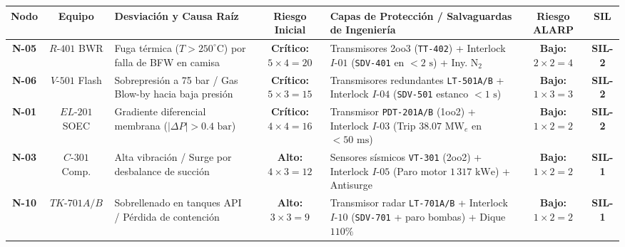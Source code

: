 \documentclass[10pt,landscape]{article}
\newcommand{\badgegreen}[1]{\colorbox{badgegreen}{\textbf{\color{emeraldgreen}\fontsize{6.8pt}{8pt}\selectfont #1}}}
\newcommand{\badgeamber}[1]{\colorbox{badgeamber}{\textbf{\color{amber!90!black}\fontsize{6.8pt}{8pt}\selectfont #1}}}
\newcommand{\badgered}[1]{\colorbox{badgered}{\textbf{\color{darkred}\fontsize{6.8pt}{8pt}\selectfont #1}}}
\begin{document}
\begin{center}
  \begin{tcolorbox}[colback=white,colframe=navyblue!70,arc=1.5mm,boxrule=0.7pt,top=2.0pt,bottom=2.0pt,left=3pt,right=3pt,width=\textwidth]
    \fontsize{4.8pt}{5.8pt}\selectfont
    \renewcommand{\arraystretch}{1.08}
    \begin{tabularx}{\textwidth}{c c p{3.2cm} c X c c}
      \toprule
      \rowcolor{tableheader}
      \textbf{\color{white}Nodo} & 
      \textbf{\color{white}Equipo} & 
      \textbf{\color{white}Desviación y Causa Raíz} & 
      \textbf{\color{white}Riesgo Inicial} & 
      \textbf{\color{white}Capas de Protección / Salvaguardas de Ingeniería} & 
      \textbf{\color{white}Riesgo ALARP} & 
      \textbf{\color{white}SIL} \\
      \midrule
      \rowcolor{roweven}
      \textbf{N-05} & $R\text{-}401$ BWR & Fuga térmica ($T > 250^\circ\text{C}$) por falla de BFW en camisa & \badgered{Crítico: $5 \times 4 = 20$} & Transmisores 2oo3 (\texttt{TT-402}) + Interlock $I\text{-}01$ (\texttt{SDV-401} en $<2\text{ s}$) + Iny. $\text{N}_2$ & \badgegreen{Bajo: $2 \times 2 = 4$} & \badgered{SIL-2} \\
      \rowcolor{rowodd}
      \textbf{N-06} & $V\text{-}501$ Flash & Sobrepresión a 75 bar / Gas Blow-by hacia baja presión & \badgered{Crítico: $5 \times 3 = 15$} & Transmisores redundantes \texttt{LT-501A/B} + Interlock $I\text{-}04$ (\texttt{SDV-501} estanco $<1\text{ s}$) & \badgegreen{Bajo: $1 \times 3 = 3$} & \badgered{SIL-2} \\
      \rowcolor{roweven}
      \textbf{N-01} & $EL\text{-}201$ SOEC & Gradiente diferencial membrana ($|\Delta P| > 0.4\text{ bar}$) & \badgered{Crítico: $4 \times 4 = 16$} & Transmisor \texttt{PDT-201A/B} (1oo2) + Interlock $I\text{-}03$ (Trip $38.07\text{ MW}_e$ en $<50\text{ ms}$) & \badgegreen{Bajo: $1 \times 2 = 2$} & \badgered{SIL-2} \\
      \rowcolor{rowodd}
      \textbf{N-03} & $C\text{-}301$ Comp. & Alta vibración / Surge por desbalance de succión & \badgeamber{Alto: $4 \times 3 = 12$} & Sensores sísmicos \texttt{VT-301} (2oo2) + Interlock $I\text{-}05$ (Paro motor $1\,317\text{ kWe}$) + Antisurge & \badgegreen{Bajo: $1 \times 2 = 2$} & \badgeamber{SIL-1} \\
      \rowcolor{roweven}
      \textbf{N-10} & $TK\text{-}701A/B$ & Sobrellenado en tanques API / Pérdida de contención & \badgeamber{Alto: $3 \times 3 = 9$} & Transmisor radar \texttt{LT-701A/B} + Interlock $I\text{-}10$ (\texttt{SDV-701} + paro bombas) + Dique $110\%$ & \badgegreen{Bajo: $1 \times 2 = 2$} & \badgeamber{SIL-1} \\
      \bottomrule
    \end{tabularx}
  \end{tcolorbox}
\end{center}
\end{document}
